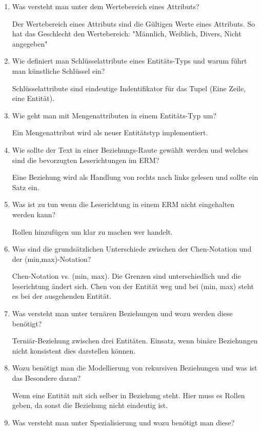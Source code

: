 \documentclass[a4paper]{article}
\begin{document}
\begin{enumerate}
    Das ERM besteht aus dem Entitäts Typen, deren Beziehungen und die Attribute von den Entitäts Typen.
    \item Was versteht man unter dem Wertebereich eines Attributs?
    
    Der Wertebereich eines Attributs sind die Gültigen Werte eines Attributs. So hat das Geschlecht den Wertebereich: "Männlich, Weiblich, Divers, Nicht angegeben"
    \item Wie definiert man Schlüsselattribute eines Entitäts-Typs und warum führt man künstliche Schlüssel ein?
    
    Schlüsselattribute sind eindeutige Indentifikator für das Tupel (Eine Zeile, eine Entität).
    \item Wie geht man mit Mengenattributen in einem Entitäts-Typ um?
    
    Ein Mengenattribut wird als neuer Entitätstyp implementiert.
    \item Wie sollte der Text in einer Beziehungs-Raute gewählt werden und welches sind die bevorzugten Leserichtungen im ERM?
    
    Eine Beziehung wird als Handlung von rechts nach links gelesen und sollte ein Satz ein.
    \item Was ist zu tun wenn die Leserichtung in einem ERM nicht eingehalten werden kann?
    
    Rollen hinzufügen um klar zu machen wer handelt.
    \item Was sind die grundsätzlichen Unterschiede zwischen der Chen-Notation und der (min,max)-Notation?
    
    Chen-Notation vs. (min, max). Die Grenzen sind unterschiedlich und die leserichtung ändert sich. Chen von der Entität weg und bei (min, max) steht es bei der ausgehenden Entität.
    \item Was versteht man unter ternären Beziehungen und wozu werden diese benötigt?
    
    Terniär-Beziehung zwischen drei Entitäten. Einsatz, wenn binäre Beziehungen nicht konsistent dies darstellen können.
    \item Wozu benötigt man die Modellierung von rekursiven Beziehungen und was ist das Besondere daran?
    
    Wenn eine Entität mit sich selber in Beziehung steht. Hier muss es Rollen geben, da sonst die Beziehung nicht eindeutig ist.
    \item Was versteht man unter Spezialisierung und wozu benötigt man diese?
    

\end{enumerate}
\end{document}
